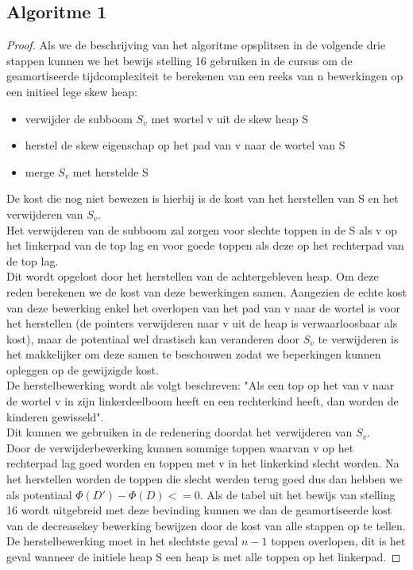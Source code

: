\documentclass[10pt,a4paper,twoside]{article}
\begin{document}
\subsection{Algoritme 1}
\begin{proof}
Als we de beschrijving van het algoritme opsplitsen in de volgende drie stappen kunnen we het bewijs stelling 16 gebruiken in de cursus om de geamortiseerde tijdcomplexiteit te berekenen van een reeks van n bewerkingen op een initieel lege skew heap:
\begin{itemize}
    \item verwijder de subboom $S_v$ met wortel v uit de skew heap S
    \item herstel de skew eigenschap op het pad van v naar de wortel van S
    \item merge $S_v$ met herstelde S
\end{itemize}
De kost die nog niet bewezen is hierbij is de kost van het herstellen van S en het verwijderen van $S_v$.\\
Het verwijderen van de subboom zal zorgen voor slechte toppen in de S als v op het linkerpad van de top lag en voor goede toppen als deze op het rechterpad van de top lag.\\
Dit wordt opgelost door het herstellen van de achtergebleven heap. Om deze reden berekenen we de kost van deze bewerkingen samen. Aangezien de echte kost van deze bewerking enkel het overlopen van het pad van v naar de wortel is voor het herstellen (de pointers verwijderen naar v uit de heap is verwaarloosbaar als kost), maar de potentiaal wel drastisch kan veranderen door $S_v$ te verwijderen is het makkelijker om deze samen te beschouwen zodat we beperkingen kunnen opleggen op de gewijzigde kost.\\
De herstelbewerking wordt als volgt beschreven: "Als een top op het van v naar de wortel v in zijn linkerdeelboom heeft en een rechterkind heeft, dan worden de kinderen gewisseld".\\
Dit kunnen we gebruiken in de redenering doordat het verwijderen van $S_v$.\\
Door de verwijderbewerking kunnen sommige toppen waarvan v op het rechterpad lag goed worden en toppen met v in het linkerkind slecht worden. Na het herstellen worden de toppen die slecht werden terug goed dus dan hebben we als potentiaal $\Phi(D')-\Phi(D)<=0$. Als de tabel uit het bewijs van stelling 16 wordt uitgebreid met deze bevinding kunnen we dan de geamortiseerde kost van de decreasekey bewerking bewijzen door de kost van alle stappen op te tellen. De herstelbewerking moet in het slechtste geval $n-1$ toppen overlopen, dit is het geval wanneer de initiele heap S een heap is met alle toppen op het linkerpad.


\end{proof}
\end{document}
